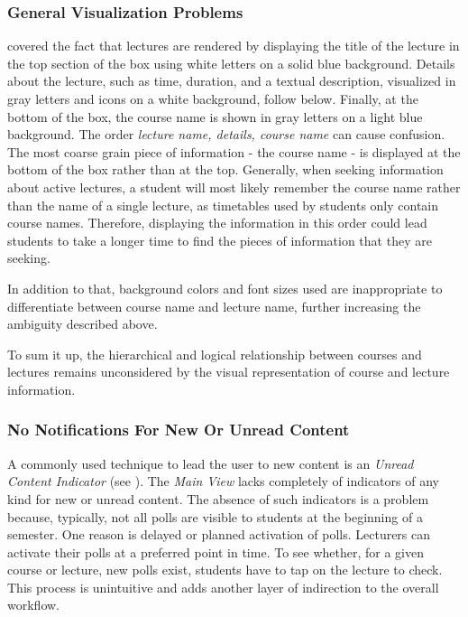 \subsubsection{General Visualization Problems}
\label{section:con:problems:mainview:generalvis}  covered the fact that lectures are rendered by displaying the title of the lecture in the top section of the box using white letters on a solid blue background. Details about the lecture, such as time, duration, and a textual description, visualized in gray letters and icons on a white background, follow below. Finally, at the bottom of the box, the course name is shown in gray letters on a light blue background. The order \emph{lecture name, details, course name} can cause confusion.
The most coarse grain piece of information - the course name - is displayed at the bottom of the box rather than at the top. Generally, when seeking information about active lectures, a student will most likely remember the course name rather than the name of a single lecture, as timetables used by students only contain course names. Therefore, displaying the information in this order could lead students to take a longer time to find the pieces of information that they are seeking.

In addition to that, background colors and font sizes used are inappropriate to differentiate between course name and lecture name, further increasing the ambiguity described above.

To sum it up, the hierarchical and logical relationship between courses and lectures remains unconsidered by the visual representation of course and lecture information.

\subsubsection{No Notifications For New Or Unread Content}
\label{section:con:problems:noindicators}
A commonly used technique to lead the user to new content is an \emph{Unread Content Indicator} (see ).
The \emph{Main View} lacks completely of indicators of any kind for new or unread content. The absence of such indicators is a problem because, typically, not all polls are visible to students at the beginning of a semester. One reason is delayed or planned activation of polls. Lecturers can activate their polls at a preferred point in time. To see whether, for a given course or lecture, new polls exist, students have to tap on the lecture to check. This process is unintuitive and adds another layer of indirection to the overall workflow.

